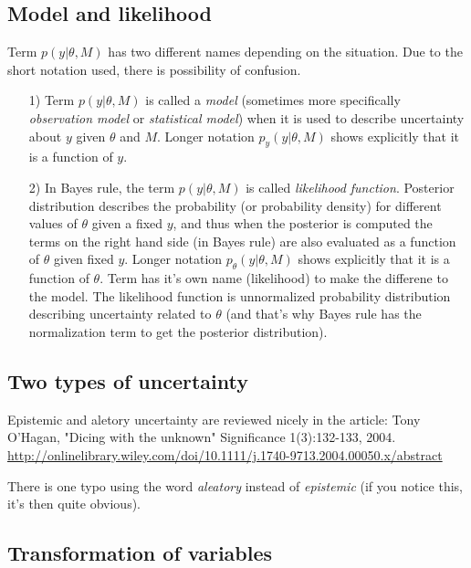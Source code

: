 \documentclass[a4paper,11pt,english]{article}
\begin{document}
\subsection*{Model and likelihood}

Term $p(y|\theta,M)$ has two different names depending on the
situation. Due to the short notation used, there is possibility of
confusion.

\begin{itemize}
\item[1)] Term $p(y|\theta,M)$ is called a \emph{model} (sometimes
  more specifically \emph{observation model} or \emph{statistical
    model}) when it is used to describe uncertainty about $y$ given
  $\theta$ and $M$. Longer notation $p_y(y|\theta,M)$ shows explicitly
  that it is a function of $y$.

\item[2)] In Bayes rule, the term $p(y|\theta,M)$ is called
  \emph{likelihood function}. Posterior distribution describes the
  probability (or probability density) for different values of
  $\theta$ given a fixed $y$, and thus when the posterior is computed
  the terms on the right hand side (in Bayes rule) are also evaluated
  as a function of $\theta$ given fixed $y$. Longer notation
  $p_\theta(y|\theta,M)$ shows explicitly that it is a function of
  $\theta$. Term has it's own name (likelihood) to make the differene
  to the model. The likelihood function is unnormalized probability
  distribution describing uncertainty related to $\theta$ (and that's
  why Bayes rule has the normalization term to get the posterior
  distribution).
\end{itemize}

\subsection*{Two types of uncertainty}

Epistemic and aletory uncertainty are reviewed nicely in the article:
Tony O'Hagan, "Dicing with the unknown"
Significance 1(3):132-133, 2004. \url{http://onlinelibrary.wiley.com/doi/10.1111/j.1740-9713.2004.00050.x/abstract}

There is one typo using the word \textit{aleatory} instead of \textit{epistemic} (if you notice this, it's then quite obvious).

\subsection*{Transformation of variables}
\end{document}

